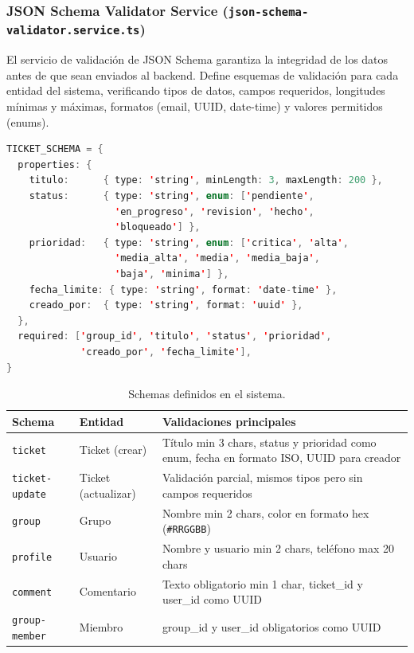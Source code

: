 \documentclass[12pt,a4paper]{article}
\begin{document}
\subsubsection{JSON Schema Validator Service (\texttt{json-schema-validator.service.ts})}

El servicio de validación de JSON Schema garantiza la integridad de los datos antes de que sean enviados al backend. Define esquemas de validación para cada entidad del sistema, verificando tipos de datos, campos requeridos, longitudes mínimas y máximas, formatos (email, UUID, date-time) y valores permitidos (enums).

\begin{lstlisting}[language=Java, caption={Ejemplo de JSON Schema para la entidad Ticket.}, label={lst:schema}]
TICKET_SCHEMA = {
  properties: {
    titulo:      { type: 'string', minLength: 3, maxLength: 200 },
    status:      { type: 'string', enum: ['pendiente',
                   'en_progreso', 'revision', 'hecho',
                   'bloqueado'] },
    prioridad:   { type: 'string', enum: ['critica', 'alta',
                   'media_alta', 'media', 'media_baja',
                   'baja', 'minima'] },
    fecha_limite: { type: 'string', format: 'date-time' },
    creado_por:  { type: 'string', format: 'uuid' },
  },
  required: ['group_id', 'titulo', 'status', 'prioridad',
             'creado_por', 'fecha_limite'],
}
\end{lstlisting}

\begin{table}[H]
    \centering
    \caption{Schemas definidos en el sistema.}
    \label{tab:schemas}
    \begin{tabular}{@{}llp{7cm}@{}}
        \toprule
        \textbf{Schema} & \textbf{Entidad} & \textbf{Validaciones principales} \\
        \midrule
        \texttt{ticket} & Ticket (crear) & Título min 3 chars, status y prioridad como enum, fecha en formato ISO, UUID para creador \\
        \texttt{ticket-update} & Ticket (actualizar) & Validación parcial, mismos tipos pero sin campos requeridos \\
        \texttt{group} & Grupo & Nombre min 2 chars, color en formato hex (\texttt{\#RRGGBB}) \\
        \texttt{profile} & Usuario & Nombre y usuario min 2 chars, teléfono max 20 chars \\
        \texttt{comment} & Comentario & Texto obligatorio min 1 char, ticket\_id y user\_id como UUID \\
        \texttt{group-member} & Miembro & group\_id y user\_id obligatorios como UUID \\
        \bottomrule
    \end{tabular}
\end{table}
\end{document}
